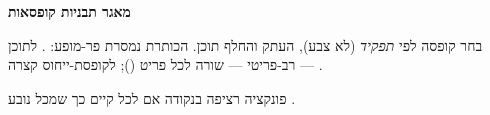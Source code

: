 %
%
%
%
%



{\LARGE\bfseries מאגר תבניות קופסאות}\par\medskip
\noindent בחר קופסה לפי \emph{תפקיד} (לא צבע), העתק והחלף תוכן. הכותרת נמסרת פר-מופע:
\code{[frametitle=\{...\}]}. לתוכן רב-פריטי — שורה לכל פריט (\code{\textbackslash\textbackslash});
לקופסת-ייחוס קצרה — .
\bigskip

\begin{defbox}[frametitle={הגדרה: פונקציה רציפה}]
\small פונקציה  רציפה בנקודה  אם לכל  קיים 
כך שמכל  נובע .
\end{defbox}
\medskip

